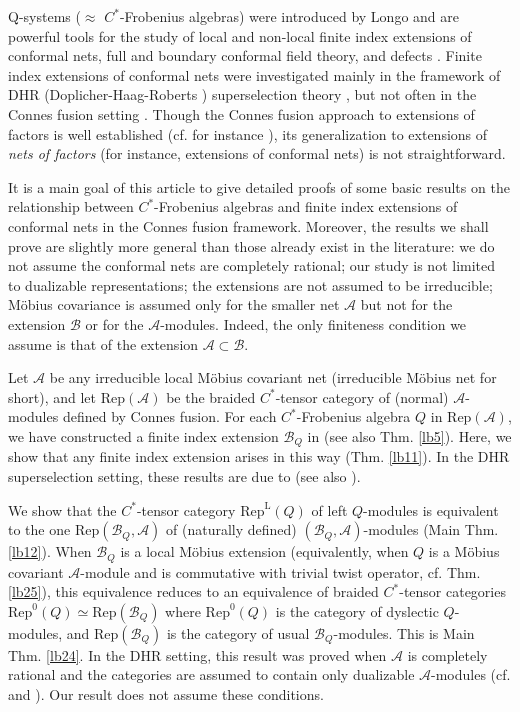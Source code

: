 \documentclass[12pt,a4paper,notitlepage]{article}
\theoremstyle{definition}
\theoremstyle{plain}
\newcommand{\mc}{\mathcal}
\newcommand{\Rep}{\mathrm{Rep}}
\newcommand{\RepA}{\mathrm{Rep}(\mathcal A)}
\newcommand{\RepL}{\mathrm{Rep}^{\mathrm{L}}}
\numberwithin{equation}{section}
\begin{document}
Q-systems ($\approx$ $C^*$-Frobenius algebras) were introduced by Longo \cite{Lon94} and are powerful tools for the study of local and non-local finite index extensions of conformal nets, full and boundary conformal field theory, and defects \cite{LR95,KL04,KLPR07,LR04,LR09,CKL13,BKR15,BKLR15,BKLR16,BDH19}. Finite index extensions of conformal nets were investigated mainly  in the framework of DHR (Doplicher-Haag-Roberts \cite{DHR71,DHR74}) superselection theory \cite{FRS89,FRS92},  but not often in the Connes fusion setting \cite{Con80,Sau83,Was98,BDH17}. Though the Connes fusion approach  to extensions of factors is well established (cf. for instance \cite{Mas97,Yuan19,GY20,CHPJP21}), its generalization to extensions of \emph{nets of factors} (for instance, extensions of conformal nets) is not straightforward.   

It is a main goal of this article to give detailed proofs  of some basic results on the relationship between $C^*$-Frobenius algebras and finite index extensions of conformal nets in the Connes fusion framework.   Moreover, the results we shall prove are slightly more general than those already exist in the literature: we do not assume the conformal nets are completely rational; our study is not limited to dualizable representations; the extensions are not assumed to be irreducible; M\"obius covariance is assumed only for the smaller net $\mc A$ but not for the extension $\mc B$ or for the $\mc A$-modules. Indeed, the only finiteness condition we assume is that of the extension $\mc A\subset\mc B$.


Let $\mc A$ be any irreducible local M\"obius covariant net (irreducible M\"obius net for short), and let $\RepA$ be the braided $C^*$-tensor category of (normal) $\mc A$-modules defined by Connes fusion. For each $C^*$-Frobenius algebra $Q$ in $\RepA$, we have constructed a finite index extension $\mc B_Q$ in \cite{Gui21b} (see also Thm. \ref{lb5}). Here, we show that any finite index extension arises in this way	(Thm. \ref{lb11}).  In the DHR superselection setting, these results are due to  \cite[Thm. 4.9]{LR95} (see also \cite[Sec. 5.2]{BKLR15}).

We show that the $C^*$-tensor category $\RepL(Q)$ of left $Q$-modules is equivalent to the one $\Rep(\mc B_Q,\mc A)$ of (naturally defined) $(\mc B_Q,\mc A)$-modules (Main Thm. \ref{lb12}). When $\mc B_Q$ is a local M\"obius extension (equivalently, when $Q$ is a M\"obius covariant $\mc A$-module and is commutative with trivial twist operator, cf. Thm. \ref{lb25}), this equivalence reduces to an equivalence of braided $C^*$-tensor categories $\Rep^0(Q)\simeq\Rep(\mc B_Q)$ where $\Rep^0(Q)$ is the category of dyslectic $Q$-modules, and $\Rep(\mc B_Q)$ is the category of usual $\mc B_Q$-modules. This is Main Thm. \ref{lb24}. In the DHR setting, this result was proved when $\mc A$ is completely rational and the categories are assumed to contain only dualizable $\mc A$-modules (cf. \cite{Mug10} and \cite[Prop. 6.4]{BKR15}). Our result does not assume these conditions.
	
\end{document}
